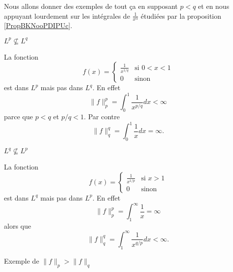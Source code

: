Nous allons donner des exemples de tout ça en supposant \( p<q\) et en nous appuyant lourdement sur les intégrales de \( \frac{1}{ x^{\alpha} }\) étudiées par la proposition \ref{PropBKNooPDIPUc}.

\begin{subproof}
    \item[\( L^p\nsubseteq L^q\)]

        La fonction
        \begin{equation}    \label{EqXIEooZpxObV}
            f(x)=\begin{cases}
                \frac{1}{ x^{1/q} }    &   \text{si } 0<x<1\\
                0    &    \text{sinon}
            \end{cases}
        \end{equation}
        est dans \( L^p\) mais pas dans \( L^q\). En effet
        \begin{equation}
            \| f \|_p^p=\int_0^1\frac{1}{ x^{p/q} }dx<\infty
        \end{equation}
        parce que \( p<q\) et \( p/q<1\). Par contre
        \begin{equation}
            \| f \|_q^q=\int_0^1\frac{1}{ x }dx=\infty.
        \end{equation}

    \item[\( L^q\nsubseteq L^p\)]

        La fonction
        \begin{equation}
            f(x)=\begin{cases}
                \frac{1}{ x^{1/p} }    &   \text{si } x>1\\
                0    &    \text{sinon}
            \end{cases}
        \end{equation}
        est dans \( L^q\) mais pas dans \( L^p\). En effet
        \begin{equation}
            \| f \|_p^p=\int_1^{\infty}\frac{1}{ x }=\infty
        \end{equation}
        alors que
        \begin{equation}
            \| f \|_q^q=\int_1^{\infty}\frac{1}{ x^{q/p} }dx<\infty.
        \end{equation}

    \item[Exemple de \( \| f \|_p>\| f \|_q\)]


\end{subproof}
